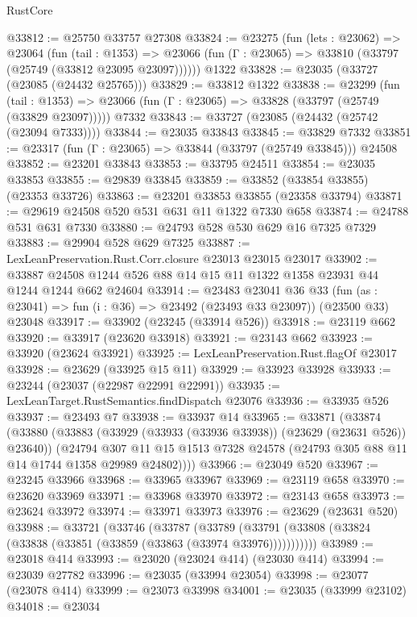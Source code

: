 \begin{lexlean}{RustCore}
\begin{coremodule}
@33812 := @25750 @33757 @27308
@33824 := @23275
    (fun (lets : @23062) =>
    @23064
      (fun (tail : @1353) =>
      @23066 (fun (Γ : @23065) => @33810 (@33797 (@25749 (@33812 @23095 @23097))))))
    @1322
@33828 := @23035 (@33727 (@23085 (@24432 @25765)))
@33829 := @33812 @1322
@33838 := @23299
    (fun (tail : @1353) => @23066 (fun (Γ : @23065) => @33828 (@33797 (@25749 (@33829 @23097)))))
    @7332
@33843 := @33727 (@23085 (@24432 (@25742 (@23094 @7333))))
@33844 := @23035 @33843
@33845 := @33829 @7332
@33851 := @23317 (fun (Γ : @23065) => @33844 (@33797 (@25749 @33845))) @24508
@33852 := @23201 @33843
@33853 := @33795 @24511
@33854 := @23035 @33853
@33855 := @29839 @33845
@33859 := @33852 (@33854 @33855) (@23353 @33726)
@33863 := @23201 @33853 @33855 (@23358 @33794)
@33871 := @29619 @24508 @520 @531 @631 @11 @1322 @7330 @658
@33874 := @24788 @531 @631 @7330
@33880 := @24793 @528 @530 @629 @16 @7325 @7329
@33883 := @29904 @528 @629 @7325
@33887 := LexLeanPreservation.Rust.Corr.closure @23013 @23015 @23017
@33902 := @33887 @24508 @1244 @526 @88 @14 @15 @11 @1322 @1358 @23931 @44 @1244 @1244 @662 @24604
@33914 := @23483
    @23041
    @36
    @33
    (fun (as : @23041) => fun (i : @36) => @23492 (@23493 @33 @23097))
    (@23500 @33)
    @23048
@33917 := @33902 (@23245 (@33914 @526))
@33918 := @23119 @662
@33920 := @33917 (@23620 @33918)
@33921 := @23143 @662
@33923 := @33920 (@23624 @33921)
@33925 := LexLeanPreservation.Rust.flagOf @23017
@33928 := @23629 (@33925 @15 @11)
@33929 := @33923 @33928
@33933 := @23244 (@23037 (@22987 @22991 @22991))
@33935 := LexLeanTarget.RustSemantics.findDispatch @23076
@33936 := @33935 @526
@33937 := @23493 @7
@33938 := @33937 @14
@33965 := @33871
    (@33874
      (@33880
        (@33883 (@33929 (@33933 (@33936 @33938)) (@23629 (@23631 @526)) @23640))
        (@24794
          @307
          @11
          @15
          @1513
          @7328
          @24578
          (@24793 @305 @88 @11 @14 @1744 @1358 @29989 @24802))))
@33966 := @23049 @520
@33967 := @23245 @33966
@33968 := @33965 @33967
@33969 := @23119 @658
@33970 := @23620 @33969
@33971 := @33968 @33970
@33972 := @23143 @658
@33973 := @23624 @33972
@33974 := @33971 @33973
@33976 := @23629 (@23631 @520)
@33988 := @33721
    (@33746
      (@33787
        (@33789 (@33791 (@33808 (@33824 (@33838 (@33851 (@33859 (@33863 (@33974 @33976)))))))))))
@33989 := @23018 @414
@33993 := @23020 (@23024 @414) (@23030 @414)
@33994 := @23039 @27782
@33996 := @23035 (@33994 @23054)
@33998 := @23077 (@23078 @414)
@33999 := @23073 @33998
@34001 := @23035 (@33999 @23102)
@34018 := @23034

\end{coremodule}
\end{lexlean}
